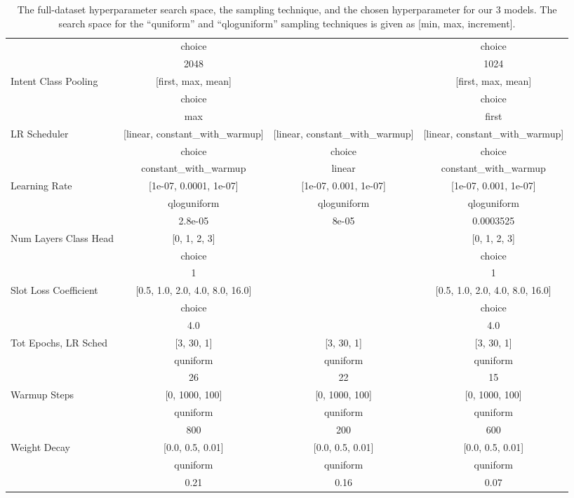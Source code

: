 \documentclass[11pt]{article}
\begin{document}
\begin{table*}[]
{\begin{tabular}{lccc}
  & choice &  & choice \\ 
  & 2048 &  & 1024 \\ 
Intent Class Pooling  & [first, max, mean] &  & [first, max, mean] \\ 
  & choice &  & choice \\ 
  & max &  & first \\ 
LR Scheduler  & [linear, constant\_with\_warmup] & [linear, constant\_with\_warmup] & [linear, constant\_with\_warmup] \\ 
  & choice & choice & choice \\ 
  & constant\_with\_warmup & linear & constant\_with\_warmup \\ 
Learning Rate  & [1e-07, 0.0001, 1e-07] & [1e-07, 0.001, 1e-07] & [1e-07, 0.001, 1e-07] \\ 
  & qloguniform & qloguniform & qloguniform \\ 
  & 2.8e-05 & 8e-05 & 0.0003525 \\ 
Num Layers Class Head  & [0, 1, 2, 3] &  & [0, 1, 2, 3] \\ 
  & choice &  & choice \\ 
  & 1 &  & 1 \\ 
Slot Loss Coefficient  & [0.5, 1.0, 2.0, 4.0, 8.0, 16.0] &  & [0.5, 1.0, 2.0, 4.0, 8.0, 16.0] \\ 
  & choice &  & choice \\ 
  & 4.0 &  & 4.0 \\ 
Tot Epochs, LR Sched  & [3, 30, 1] & [3, 30, 1] & [3, 30, 1] \\ 
  & quniform & quniform & quniform \\ 
  & 26 & 22 & 15 \\ 
Warmup Steps  & [0, 1000, 100] & [0, 1000, 100] & [0, 1000, 100] \\ 
  & quniform & quniform & quniform \\ 
  & 800 & 200 & 600 \\ 
Weight Decay  & [0.0, 0.5, 0.01] & [0.0, 0.5, 0.01] & [0.0, 0.5, 0.01] \\ 
  & quniform & quniform & quniform \\ 
  & 0.21 & 0.16 & 0.07 \\ 
\bottomrule
\end{tabular}
}
\caption{The full-dataset hyperparameter search space, the sampling technique, and the chosen hyperparameter for our 3 models. The search space for the ``quniform'' and ``qloguniform'' sampling techniques is given as [min, max, increment].}
\label{tab:model_hyperparams}
\end{table*}
\end{document}
